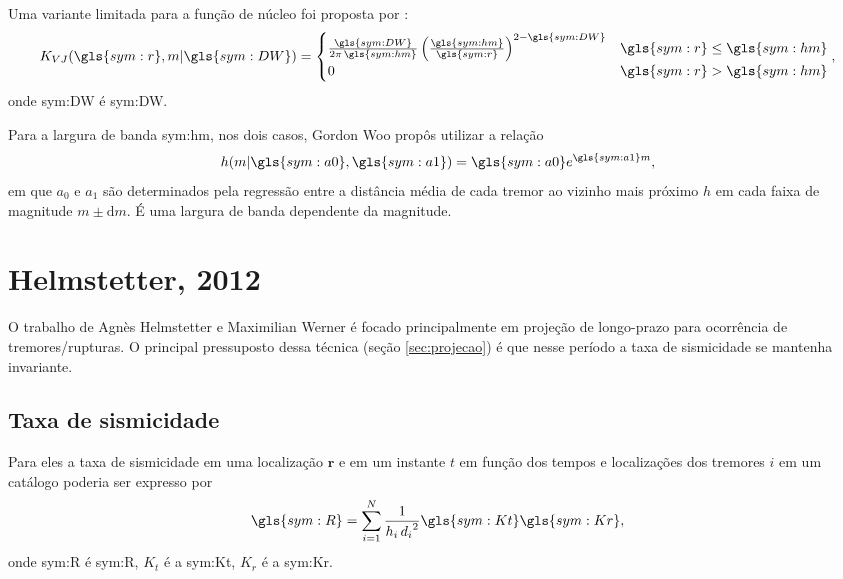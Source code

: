 Uma variante limitada para a função de núcleo foi proposta por \citet{verejones_1992}:\begin{equation}
	\ensuremath{
		K_{VJ}(\gls{sym:r}, m \arrowvert \gls{sym:DW}) = 
		\begin{cases}
			\frac{\gls{sym:DW}}{2\pi\,\gls{sym:hm}} 
			\left( \frac{\gls{sym:hm}}{\gls{sym:r}} \right)^{2 - \gls{sym:DW}} 
			  & \gls{sym:r} \leq \gls{sym:hm} \\
			0 & \gls{sym:r} > \gls{sym:hm}
		\end{cases},
	}
	\label{eq:k_vj}
\end{equation}
onde \gls{sym:DW} é \glsdesc{sym:DW}.

Para a largura de banda \gls{sym:hm}, nos dois casos, Gordon Woo propôs utilizar a relação
\begin{equation}
	\ensuremath{
		h(m\arrowvert \gls{sym:a0}, \gls{sym:a1}) = \gls{sym:a0}e^{\gls{sym:a1}m},
	}
	\label{eq:hm}
\end{equation}
em que $a_0$ e $a_1$ são determinados pela regressão entre a 
distância média de cada tremor ao vizinho mais próximo $h$ em cada faixa de magnitude $m \pm \mathrm{d}m$.
É uma largura de banda dependente da magnitude.


\section{Helmstetter, 2012}
\label{sec:helmstetter}

O trabalho de  Agnès Helmstetter e Maximilian Werner \citep{helmstetter_2012} é focado principalmente em 
projeção de longo-prazo para ocorrência de tremores/rupturas. 
O principal pressuposto dessa técnica (seção \ref{sec:projecao}) é que nesse período a taxa
de sismicidade se mantenha invariante.

\subsection{Taxa de sismicidade}
Para eles a taxa de sismicidade em uma localização
$\boldsymbol{r}$ e em um instante $t$ 
em função dos tempos e localizações dos tremores $i$ em um catálogo 
poderia ser expresso por
\begin{equation}
	\ensuremath{\gls{sym:R} = \sum_{i=1}^{N}{ \frac{1}{h_i\,{d_i}^2} \gls{sym:Kt}\gls{sym:Kr} }},
	\label{eq:helms01}
\end{equation}
onde \gls{sym:R} é \glsdesc{sym:R}, 
	  $K_t$ é a \glsdesc{sym:Kt}, 
	  $K_r$ é a \glsdesc{sym:Kr}.

